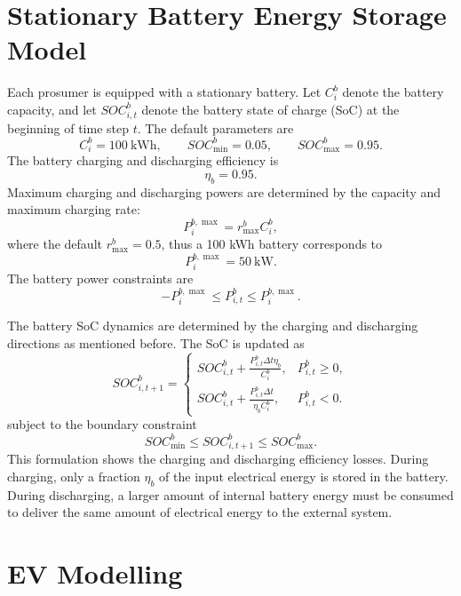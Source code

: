 \section{Stationary Battery Energy Storage Model}

Each prosumer is equipped with a stationary battery. Let \(C^b_i\) denote the battery capacity, and let \(SOC^b_{i,t}\) denote the battery state of charge (SoC) at the beginning of time step \(t\). The default parameters are
\[
  C^b_i=100\ \mathrm{kWh}, \qquad
  SOC^b_{\min}=0.05, \qquad
  SOC^b_{\max}=0.95.
\]
The battery charging and discharging efficiency is
\[
  \eta_b=0.95.
\]
Maximum charging and discharging powers are determined by the capacity and maximum charging rate:
\[
  P^{b,\max}_i = r^b_{\max} C^b_i,
\]
where the default \(r^b_{\max}=0.5\), thus a 100 kWh battery corresponds to
\[
  P^{b,\max}_i=50\ \mathrm{kW}.
\]
The battery power constraints are
\[
  -P^{b,\max}_i \le P^b_{i,t} \le P^{b,\max}_i.
\]

The battery SoC dynamics are determined by the charging and discharging directions as mentioned before. The SoC is updated as
\[
SOC^b_{i,t+1} =
\left\{
\begin{array}{ll}
SOC^b_{i,t}+\frac{P^b_{i,t}\Delta t\eta_b}{C^b_i},
& P^b_{i,t}\ge 0,\\[2mm]
SOC^b_{i,t}+\frac{P^b_{i,t}\Delta t}{\eta_b C^b_i},
& P^b_{i,t}<0.
\end{array}
\right.
\]
subject to the boundary constraint
\[
  SOC^b_{\min}\le SOC^b_{i,t+1}\le SOC^b_{\max}.
\]
This formulation shows the charging and discharging efficiency losses. During charging, only a fraction \(\eta_b\) of the input electrical energy is stored in the battery. During discharging, a larger amount of internal battery energy must be consumed to deliver the same amount of electrical energy to the external system.

\section{EV Modelling}

